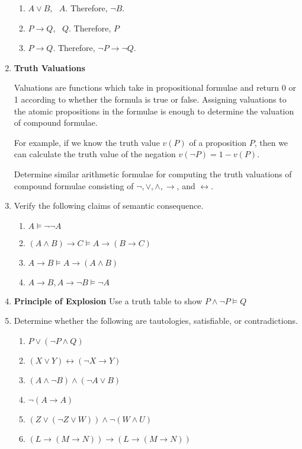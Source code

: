 \documentclass[11pt]{report}
\begin{document}
\begin{enumerate}
	\begin{enumerate}
		\item $A \lor B$, \ $A$. Therefore, $\lnot B$.
		\item $P \rightarrow Q$, \ $Q$. Therefore, $P$
		\item $P \rightarrow Q$. Therefore, $\lnot P \rightarrow \lnot Q$. 
	\end{enumerate}

	\item {\bf Truth Valuations} 
	
	Valuations are functions which take in propositional formulae and return 0 or 1 according to whether the formula is true or false. Assigning valuations to the atomic propositions in the formulae is enough to determine the valuation of compound formulae. 

	\vspace{0.2cm}

	For example, if we know the truth value $v(P)$ of a proposition $P$, then we can calculate the truth value of the negation $v(\lnot P) = 1 - v(P)$. 

	\vspace{0.2cm}

	Determine similar arithmetic formulae for computing the truth valuations of compound formulae consisting of $\lnot, \lor, \land, \rightarrow$, and $\leftrightarrow$. 
	
	\newpage
	\item Verify the following claims of semantic consequence.
	
	\begin{enumerate}
		\item $ A \models \lnot\lnot A$
		\item $( A \land  B) \rightarrow  C \models  A \rightarrow ( B \rightarrow  C)$
		\item $ A \rightarrow  B \models  A \rightarrow ( A \land  B)$
		\item $ A \rightarrow  B,  A \rightarrow \lnot  B \models \lnot  A$
	\end{enumerate}	

	
	\item {\bf Principle of Explosion} Use a truth table to show $P \land \lnot P \models Q$
	
	
	\item Determine whether the following are tautologies, satisfiable, or contradictions.
	
		\begin{enumerate}
			\item $P \lor (\lnot P \land Q)$
			\item $(X \lor Y) \leftrightarrow (\lnot X \rightarrow Y)$
			\item $(A \land \lnot B) \land (\lnot A \lor B)$
			\item $\lnot (A\rightarrow A)$
			\item $(Z \lor (\lnot Z \lor W)) \land \lnot (W \land U)$
			\item $(L \rightarrow (M \rightarrow N)) \rightarrow (L \rightarrow (M \rightarrow N))$
		\end{enumerate}


\end{enumerate}
\end{document}
